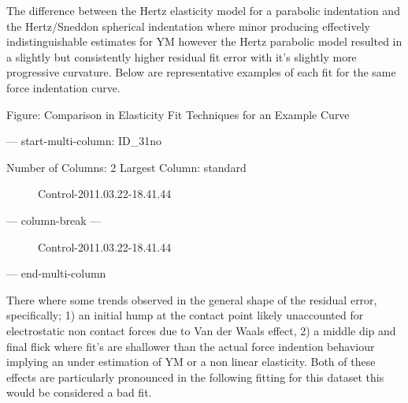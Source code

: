 \documentclass[
  paper=a4,
  ,captions=tableheading
]{scrartcl}
\makeatletter
\newenvironment{Shaded}{}{}
\newcommand{\NormalTok}[1]{#1}
\newcommand*\pandocbounded[1]{%
  \sbox\pandoc@box{#1}%
  \Gscale@div\@tempa{\textheight}{\dimexpr\ht\pandoc@box+\dp\pandoc@box\relax}%
  \Gscale@div\@tempb{\linewidth}{\wd\pandoc@box}%
  \ifdim\@tempb\p@<\@tempa\p@\let\@tempa\@tempb\fi%
  \ifdim\@tempa\p@<\p@\scalebox{\@tempa}{\usebox\pandoc@box}%
  \else\usebox{\pandoc@box}%
  \fi%
}
\makeatother
\begin{document}
The difference between the Hertz elasticity model for a parabolic
indentation and the Hertz/Sneddon spherical indentation where minor
producing effectively indistinguishable estimates for YM however the
Hertz parabolic model resulted in a slightly but consistently higher
residual fit error with it's slightly more progressive curvature. Below
are representative examples of each fit for the same force indentation
curve.

Figure: Comparison in Elasticity Fit Techniques for an Example Curve

--- start-multi-column: ID\_31no

\begin{Shaded}
\begin{Highlighting}[]
\NormalTok{Number of Columns: 2}
\NormalTok{Largest Column: standard}
\end{Highlighting}
\end{Shaded}

\begin{figure}
\centering
\pandocbounded{}
\caption{Control-2011.03.22-18.41.44}
\end{figure}

--- column-break ---

\begin{figure}
\centering
\pandocbounded{}
\caption{Control-2011.03.22-18.41.44}
\end{figure}

--- end-multi-column

There where some trends observed in the general shape of the residual
error, specifically; 1) an initial hump at the contact point likely
unaccounted for electrostatic non contact forces due to Van der Waals
effect, 2) a middle dip and final flick where fit's are shallower than
the actual force indention behaviour implying an under estimation of YM
or a non linear elasticity. Both of these effects are particularly
pronounced in the following fitting for this dataset this would be
considered a bad fit.
\end{document}
